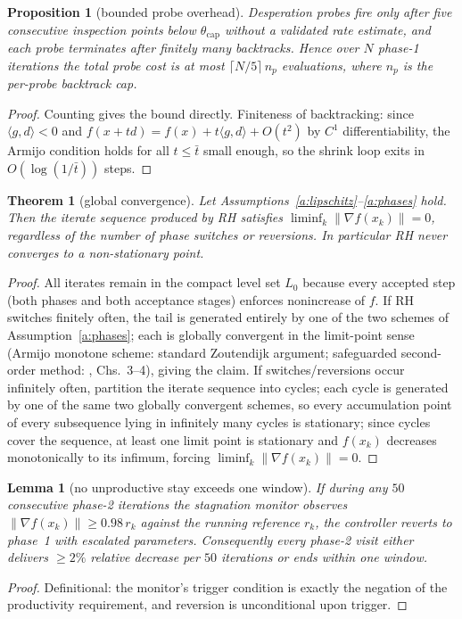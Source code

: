 ﻿\documentclass[10pt]{article}
\newtheorem{lemma}{Lemma}
\newtheorem{proposition}{Proposition}
\newtheorem{theorem}{Theorem}
\begin{document}
\begin{proposition}[bounded probe overhead]\label{prop:overhead}
Desperation probes fire only after five consecutive inspection points
below $\theta_{\mathrm{cap}}$ without a validated rate estimate, and
each probe terminates after finitely many backtracks. Hence over $N$
phase-1 iterations the total probe cost is at most
$\lceil N/5\rceil\, n_p$ evaluations, where $n_p$ is the per-probe
backtrack cap.
\end{proposition}
\begin{proof}
Counting gives the bound directly. Finiteness of backtracking: since
$\langle g,d\rangle<0$ and $f(x+t d)=f(x)+t\langle g,d\rangle+O(t^2)$
by $C^1$ differentiability, the Armijo condition holds for all
$t\le\bar t$ small enough, so the shrink loop exits in
$O(\log(1/\bar t))$ steps.
\end{proof}

\begin{theorem}[global convergence]\label{thm:rhconv}
Let Assumptions~\ref{a:lipschitz}--\ref{a:phases} hold. Then the
iterate sequence produced by RH satisfies
$\liminf_k \|\nabla f(x_k)\| = 0$, regardless of the number of phase
switches or reversions. In particular RH never converges to a
non-stationary point.
\end{theorem}
\begin{proof}
All iterates remain in the compact level set $L_0$ because every
accepted step (both phases and both acceptance stages) enforces
nonincrease of $f$. If RH switches finitely often, the tail is
generated entirely by one of the two schemes of
Assumption~\ref{a:phases}; each is globally convergent in the limit-point
sense (Armijo monotone scheme: standard Zoutendijk argument;
safeguarded second-order method: \cite{nw}, Chs.~3--4), giving the
claim. If switches/reversions occur infinitely often, partition the
iterate sequence into cycles; each cycle is generated by one of the
same two globally convergent schemes, so every accumulation point of
every subsequence lying in infinitely many cycles is stationary; since
cycles cover the sequence, at least one limit point is stationary and
$f(x_k)$ decreases monotonically to its infimum, forcing
$\liminf_k\|\nabla f(x_k)\|=0$.
\end{proof}

\begin{lemma}[no unproductive stay exceeds one window]
\label{lem:stagnation}
If during any $50$ consecutive phase-2 iterations the stagnation
monitor observes $\|\nabla f(x_k)\| \ge 0.98\, r_k$ against the running
reference $r_k$, the controller reverts to phase~1 with escalated
parameters. Consequently every phase-2 visit either delivers
${\ge}2\%$ relative decrease per $50$ iterations or ends within one
window.
\end{lemma}
\begin{proof}
Definitional: the monitor's trigger condition is exactly the negation
of the productivity requirement, and reversion is unconditional upon
trigger.
\end{proof}
\end{document}
